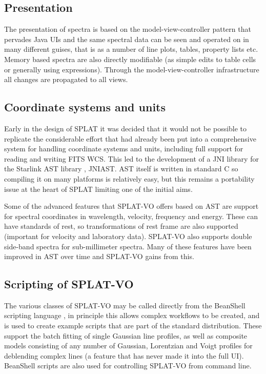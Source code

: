 \documentclass[final,authoryear,5p,times,twocolumn]{elsarticle}
\begin{document}
\subsection{Presentation}

The presentation of spectra is based on the model-view-controller pattern that
pervades Java UIs and the same spectral data can be seen and operated on in
many different guises, that is as a number of line plots, tables, property
lists etc. Memory based spectra are also directly modifiable (as simple edits
to table cells or generally using expressions). Through the
model-view-controller infrastructure all changes are propagated to all views.


\subsection{Coordinate systems and units}

Early in the design of SPLAT it was decided that it would not be possible to
replicate the considerable effort that had already been put into a
comprehensive system for handling coordinate systems and units, including full
support for reading and writing FITS WCS. This led to the development of a JNI
library for the Starlink AST library \citep{1998ASPC..145...41W}, JNIAST. AST
itself is written in standard C so compiling it on many platforms is
relatively easy, but this remains a portability issue at the heart of SPLAT
limiting one of the initial aims.

Some of the advanced features that SPLAT-VO offers based on AST are support
for spectral coordinates in wavelength, velocity, frequency and energy. These
can have standards of rest, so transformations of rest frame are also
supported (important for velocity and laboratory data). SPLAT-VO also supports
double side-band spectra for sub-millimeter spectra. Many of these features
have been improved in AST over time and SPLAT-VO gains from this.


\subsection{Scripting of SPLAT-VO}

The various classes of SPLAT-VO may be called directly from the BeanShell
scripting language \citep{niemeyer2013learning}, in principle this allows
complex workflows to be created, and is used to create example scripts that
are part of the standard distribution. These support the batch fitting of
single Gaussian line profiles, as well as composite models consisting of any
number of Gaussian, Lorentzian and Voigt profiles for deblending complex lines
(a feature that has never made it into the full UI). BeanShell scripts are
also used for controlling SPLAT-VO from command line.
\end{document}
